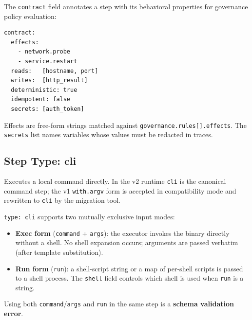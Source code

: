 The \texttt{contract} field annotates a step with its behavioral properties for
governance policy evaluation:

\begin{verbatim}
contract:
  effects:
    - network.probe
    - service.restart
  reads:   [hostname, port]
  writes:  [http_result]
  deterministic: true
  idempotent: false
  secrets: [auth_token]
\end{verbatim}

Effects are free-form strings matched against \texttt{governance.rules[].effects}.
The \texttt{secrets} list names variables whose values must be redacted in traces.

\subsection{Step Type: cli}
\label{subsec:step-cli}

Executes a local command directly.  In the v2 runtime \texttt{cli} is the
canonical command step; the v1 \texttt{with.argv} form is accepted in
compatibility mode and rewritten to \texttt{cli} by the migration tool.

\texttt{type: cli} supports two mutually exclusive input modes:

\begin{itemize}
  \item \textbf{Exec form} (\texttt{command} + \texttt{args}): the executor
        invokes the binary directly without a shell.  No shell expansion occurs;
        arguments are passed verbatim (after template substitution).
  \item \textbf{Run form} (\texttt{run}): a shell-script string or a map of
        per-shell scripts is passed to a shell process.  The \texttt{shell}
        field controls which shell is used when \texttt{run} is a string.
\end{itemize}

Using both \texttt{command}/\texttt{args} and \texttt{run} in the same step is
a \textbf{schema validation error}.

